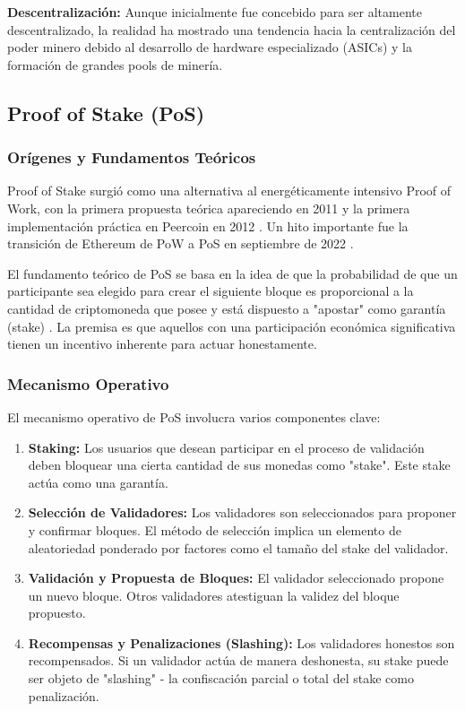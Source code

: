 \documentclass[spanish,12pt,letterpaper]{report}
\begin{document}
\textbf{Descentralización:} Aunque inicialmente fue concebido para ser altamente descentralizado, la realidad ha mostrado una tendencia hacia la centralización del poder minero debido al desarrollo de hardware especializado (ASICs) y la formación de grandes pools de minería.

\subsection{Proof of Stake (PoS)}

\subsubsection{Orígenes y Fundamentos Teóricos}

Proof of Stake surgió como una alternativa al energéticamente intensivo Proof of Work, con la primera propuesta teórica apareciendo en 2011 y la primera implementación práctica en Peercoin en 2012 \parencite{itm2025pos}. Un hito importante fue la transición de Ethereum de PoW a PoS en septiembre de 2022 \parencite{ethereum2022merge}.

El fundamento teórico de PoS se basa en la idea de que la probabilidad de que un participante sea elegido para crear el siguiente bloque es proporcional a la cantidad de criptomoneda que posee y está dispuesto a "apostar" como garantía (stake) \parencite{investopedia2024pos}. La premisa es que aquellos con una participación económica significativa tienen un incentivo inherente para actuar honestamente.

\subsubsection{Mecanismo Operativo}

El mecanismo operativo de PoS involucra varios componentes clave:

\begin{enumerate}
    \item \textbf{Staking:} Los usuarios que desean participar en el proceso de validación deben bloquear una cierta cantidad de sus monedas como "stake". Este stake actúa como una garantía.
    \item \textbf{Selección de Validadores:} Los validadores son seleccionados para proponer y confirmar bloques. El método de selección implica un elemento de aleatoriedad ponderado por factores como el tamaño del stake del validador.
    \item \textbf{Validación y Propuesta de Bloques:} El validador seleccionado propone un nuevo bloque. Otros validadores atestiguan la validez del bloque propuesto.
    \item \textbf{Recompensas y Penalizaciones (Slashing):} Los validadores honestos son recompensados. Si un validador actúa de manera deshonesta, su stake puede ser objeto de "slashing" - la confiscación parcial o total del stake como penalización.
\end{enumerate}
\end{document}
